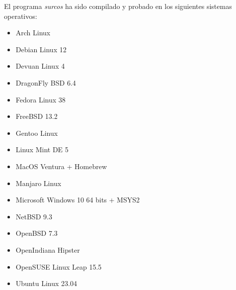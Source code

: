 El programa \emph{surcos} ha sido compilado y probado en los siguientes sistemas
operativos:
\begin{itemize}
\item Arch Linux
\item Debian Linux 12
\item Devuan Linux 4
\item DragonFly BSD 6.4
\item Fedora Linux 38
\item FreeBSD 13.2
\item Gentoo Linux
\item Linux Mint DE 5
\item MacOS Ventura + Homebrew
\item Manjaro Linux
\item Microsoft Windows 10 64 bits + MSYS2
\item NetBSD 9.3
\item OpenBSD 7.3
\item OpenIndiana Hipster
\item OpenSUSE Linux Leap 15.5
\item Ubuntu Linux 23.04
\end{itemize}

